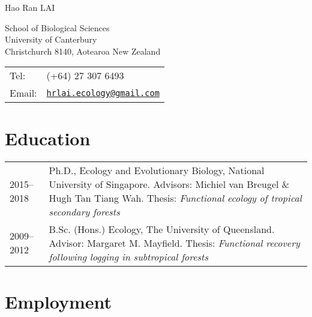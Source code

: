 \documentclass[a4paper]{article}
\def\name{Hao Ran LAI}
\begin{document}
{\LARGE \name}


\vspace{0.25in}

\begin{minipage}{0.6\linewidth}
  School of Biological Sciences \\
  University of Canterbury \\
  Christchurch 8140, Aotearoa New Zealand
\end{minipage}
\begin{minipage}{0.35\linewidth}
  \begin{tabular}{ll}
    Tel:   & (+64) 27 307 6493 \\
    Email: & \href{mailto:hrlai.ecology@gmail.com}{\tt hrlai.ecology@gmail.com} \\
  \end{tabular}
\end{minipage}



\section*{Education}

\begin{tabular}{p{0.13\linewidth} p{0.87\linewidth}}

2015--2018 & Ph.D., Ecology and Evolutionary Biology, National University of Singapore. Advisors: Michiel van Breugel \& Hugh Tan Tiang Wah. Thesis: \textit{Functional ecology of tropical secondary forests} \\

2009--2012 & B.Sc. (Hons.) Ecology, The University of Queensland. Advisor: Margaret M. Mayfield. Thesis: \textit{Functional recovery following logging in subtropical forests}\\

\end{tabular}


\section*{Employment}
\end{document}

